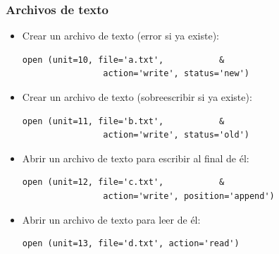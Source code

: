 \documentclass[12pt]{beamer}
\begin{document}
  \begin{frame}[fragile]
    \frametitle{Archivos de texto}
    \begin{itemize}
      \item Crear un archivo de texto (error si ya existe):
        \begin{lstlisting}[gobble=8,frame=single]
          open (unit=10, file='a.txt',           &
                action='write', status='new')
        \end{lstlisting}
      \item Crear un archivo de texto (sobreescribir si ya existe):
        \begin{lstlisting}[gobble=8,frame=single]
          open (unit=11, file='b.txt',           &
                action='write', status='old')
        \end{lstlisting}
      \item Abrir un archivo de texto para escribir al final de él:
        \begin{lstlisting}[gobble=8,frame=single]
          open (unit=12, file='c.txt',           &
                action='write', position='append')
        \end{lstlisting}
      \item Abrir un archivo de texto para leer de él:
        \begin{lstlisting}[gobble=8,frame=single]
          open (unit=13, file='d.txt', action='read')
        \end{lstlisting}
    \end{itemize}

\end{frame}
\end{document}
